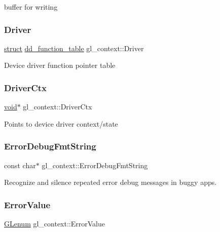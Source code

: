 buffer for writing \mbox{\label{structgl__context_ab3a40dffd6176c154014e6ed457da31e}} 
\subsubsection{\texorpdfstring{Driver}{Driver}}
{\footnotesize\ttfamily \hyperlink{interfacestruct}{struct} \hyperlink{structdd__function__table}{dd\+\_\+function\+\_\+table} gl\+\_\+context\+::\+Driver}

Device driver function pointer table \mbox{\label{structgl__context_a8c538dbb407e8bf2f28b4cafad05bdee}} 
\subsubsection{\texorpdfstring{Driver\+Ctx}{DriverCtx}}
{\footnotesize\ttfamily \hyperlink{interfacevoid}{void}$\ast$ gl\+\_\+context\+::\+Driver\+Ctx}

Points to device driver context/state \mbox{\label{structgl__context_a82c1612f3a2e94b3a49a844838bcb917}} 
\subsubsection{\texorpdfstring{Error\+Debug\+Fmt\+String}{ErrorDebugFmtString}}
{\footnotesize\ttfamily const char$\ast$ gl\+\_\+context\+::\+Error\+Debug\+Fmt\+String}

Recognize and silence repeated error debug messages in buggy apps. \mbox{\label{structgl__context_a49e26ac67855e06f51644dd62c47fb50}} 
\subsubsection{\texorpdfstring{Error\+Value}{ErrorValue}}
{\footnotesize\ttfamily \hyperlink{interfacevoid}{G\+Lenum} gl\+\_\+context\+::\+Error\+Value}

